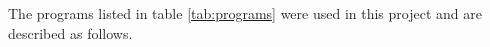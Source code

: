 The programs listed in table \ref{tab:programs} were used in this project and
are described as follows.


